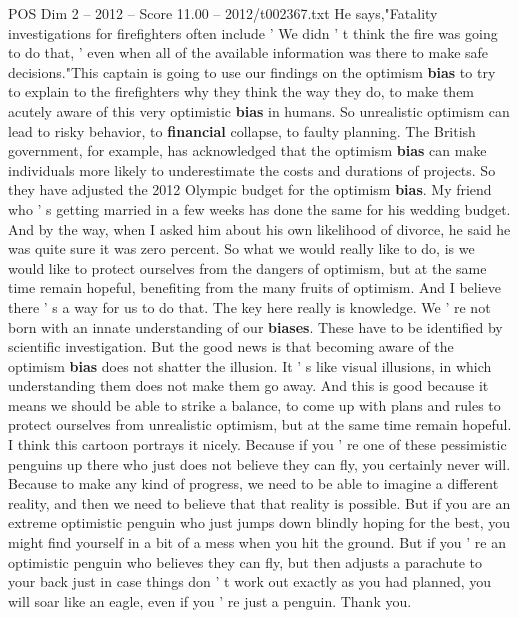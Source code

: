 \begin{textsample}{POS Dim 2 – 2012 – Score 11.00 – 2012/t002367.txt}
He says,"Fatality investigations for firefighters often include ' We didn ' t think the fire was going to do that, ' even when all of the available information was there to make safe decisions."This captain is going to use our findings on the optimism \textbf{bias} to try to explain to the firefighters why they think the way they do, to make them acutely aware of this very optimistic \textbf{bias} in humans.
So unrealistic optimism can lead to risky behavior, to \textbf{financial} collapse, to faulty planning.
The British government, for example, has acknowledged that the optimism \textbf{bias} can make individuals more likely to underestimate the costs and durations of projects.
So they have adjusted the 2012 Olympic budget for the optimism \textbf{bias}.
My friend who ' s getting married in a few weeks has done the same for his wedding budget.
And by the way, when I asked him about his own likelihood of divorce, he said he was quite sure it was zero percent.
So what we would really like to do, is we would like to protect ourselves from the dangers of optimism, but at the same time remain hopeful, benefiting from the many fruits of optimism.
And I believe there ' s a way for us to do that.
The key here really is knowledge.
We ' re not born with an innate understanding of our \textbf{biases}.
These have to be identified by scientific investigation.
But the good news is that becoming aware of the optimism \textbf{bias} does not shatter the illusion.
It ' s like visual illusions, in which understanding them does not make them go away.
And this is good because it means we should be able to strike a balance, to come up with plans and rules to protect ourselves from unrealistic optimism, but at the same time remain hopeful.
I think this cartoon portrays it nicely.
Because if you ' re one of these pessimistic penguins up there who just does not believe they can fly, you certainly never will.
Because to make any kind of progress, we need to be able to imagine a different reality, and then we need to believe that that reality is possible.
But if you are an extreme optimistic penguin who just jumps down blindly hoping for the best, you might find yourself in a bit of a mess when you hit the ground.
But if you ' re an optimistic penguin who believes they can fly, but then adjusts a parachute to your back just in case things don ' t work out exactly as you had planned, you will soar like an eagle, even if you ' re just a penguin.
Thank you.

\end{textsample}
